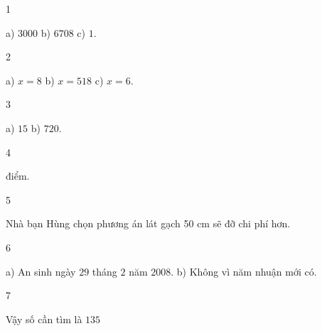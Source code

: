 \begin{Solbook}{1}
 \par \noindent a) $3000$ \hfill b) $6708$ \hfill c) $1$.  \hfill \qedEX 
\end{Solbook}
\begin{Solbook}{2}
 \par \noindent a) $x=8$ \hfill b) $x=518$ \hfill c) $x=6$. \hfill \qedEX 
\end{Solbook}
\begin{Solbook}{3}
 \par \noindent a) $15$ \hfill b) $720$.  \hfill \qedEX 
\end{Solbook}
\begin{Solbook}{4}
 \par {} điểm. \hfill \qedEX 
\end{Solbook}
\begin{Solbook}{5}
 \par \noindent  Nhà bạn Hùng chọn phương án lát gạch 50 cm sẽ đỡ chi phí hơn. \hfill \qedEX 
\end{Solbook}
\begin{Solbook}{6}
 \par \noindent  a) An sinh ngày $29$ tháng $2$ năm $2008$. \hfill b) Không vì năm nhuận mới có.  \hfill \qedEX 
\end{Solbook}
\begin{Solbook}{7}
 \par \noindent  Vậy số cần tìm là $135$  \hfill \qedEX 
\end{Solbook}
